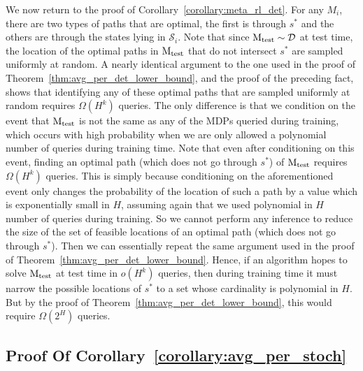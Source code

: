 \documentclass[11pt,twoside]{article}
\begin{document}
We now return to the proof of Corollary~\ref{corollary:meta_rl_det}. For any $M_i$, there are two types of paths that are optimal, the first is through $s^*$ and the others are through the states lying in $\mathcal{S}_i$. Note that since $\operatorname{M_{test}} \sim \mathcal{D}$ at test time, the location of the optimal paths in $\operatorname{M_{test}}$ that do not intersect $s^*$ are sampled uniformly at random. A nearly identical argument to the one used in the proof of Theorem~\ref{thm:avg_per_det_lower_bound}, and the proof of the preceding fact, shows that identifying any of these optimal paths that are sampled uniformly at random requires $\Omega(H^k)$ queries. The only difference is that we condition on the event that $\operatorname{M_{test}}$ is not the same as any of the MDPs queried during training, which occurs with high probability when we are only allowed a polynomial number of queries during training time. Note that even after conditioning on this event, finding an optimal path (which does not go through $s^*$) of $\operatorname{M_{test}}$ requires $\Omega(H^k)$ queries. This is simply because conditioning on the aforementioned event only changes the probability of the location of such a path by a value which is exponentially small in $H$, assuming again that we used polynomial in $H$ number of queries during training. So we cannot perform any inference to reduce the size of the set of feasible locations of an optimal path (which does not go through $s^*$). Then we can essentially repeat the same argument used in the proof of Theorem~\ref{thm:avg_per_det_lower_bound}. Hence, if an algorithm hopes to solve $\operatorname{M_{test}}$ at test time in $o(H^k)$ queries, then during training time it must narrow the possible locations of $s^*$ to a set whose cardinality is polynomial in $H$. But by the proof of Theorem~\ref{thm:avg_per_det_lower_bound}, this would require $\Omega(2^H)$ queries.

\subsection{Proof Of Corollary~\ref{corollary:avg_per_stoch}}
\label{app:lower_corr_avg_per_stoch}
\end{document}
